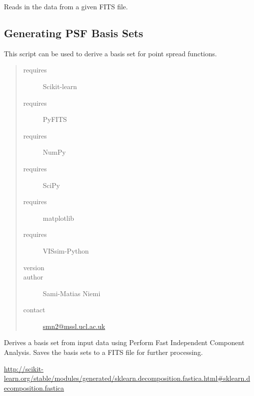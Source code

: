 \documentclass[a4paper,12pt,english]{sphinxmanual}
\begin{document}
\begin{fulllineitems}
\label{analysis:analysis.PSFproperties.readData}
Reads in the data from a given FITS file.

\end{fulllineitems}

\label{analysis:module-analysis.PSFbasisSets}

\subsection{Generating PSF Basis Sets}
\label{analysis:generating-psf-basis-sets}
This script can be used to derive a basis set for point spread functions.
\begin{quote}\begin{description}
\item[{requires}] \leavevmode
Scikit-learn

\item[{requires}] \leavevmode
PyFITS

\item[{requires}] \leavevmode
NumPy

\item[{requires}] \leavevmode
SciPy

\item[{requires}] \leavevmode
matplotlib

\item[{requires}] \leavevmode
VISsim-Python

\item[{version}] 

\item[{author}] \leavevmode
Sami-Matias Niemi

\item[{contact}] \leavevmode
\href{mailto:smn2@mssl.ucl.ac.uk}{smn2@mssl.ucl.ac.uk}

\end{description}\end{quote}

\begin{fulllineitems}
\label{analysis:analysis.PSFbasisSets.deriveBasisSetsICA}
Derives a basis set from input data using Perform Fast Independent Component Analysis.
Saves the basis sets to a FITS file for further processing.

\href{http://scikit-learn.org/stable/modules/generated/sklearn.decomposition.fastica.html\#sklearn.decomposition.fastica}{http://scikit-learn.org/stable/modules/generated/sklearn.decomposition.fastica.html\#sklearn.decomposition.fastica}

\end{fulllineitems}
\end{document}
